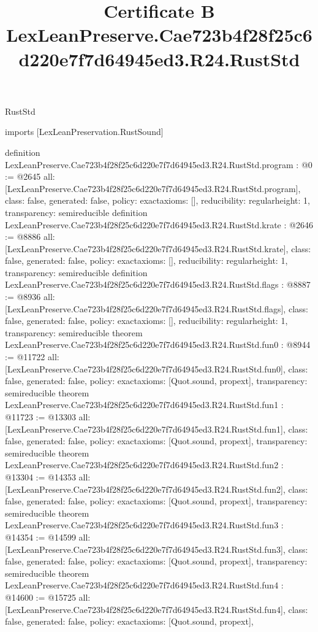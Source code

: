 \begin{lexlean}{RustStd}
\title{Certificate B LexLeanPreserve.Cae723b4f28f25c6d220e7f7d64945ed3.R24.RustStd}
\begin{coremodule}
imports [LexLeanPreservation.RustSound]

definition LexLeanPreserve.Cae723b4f28f25c6d220e7f7d64945ed3.R24.RustStd.program : @0 := @2645 {
  all: [LexLeanPreserve.Cae723b4f28f25c6d220e7f7d64945ed3.R24.RustStd.program],
  class: false,
  generated: false,
  policy: exact{axioms: []},
  reducibility: regular{height: 1},
  transparency: semireducible
}
definition LexLeanPreserve.Cae723b4f28f25c6d220e7f7d64945ed3.R24.RustStd.krate : @2646 := @8886 {
  all: [LexLeanPreserve.Cae723b4f28f25c6d220e7f7d64945ed3.R24.RustStd.krate],
  class: false,
  generated: false,
  policy: exact{axioms: []},
  reducibility: regular{height: 1},
  transparency: semireducible
}
definition LexLeanPreserve.Cae723b4f28f25c6d220e7f7d64945ed3.R24.RustStd.flags : @8887 := @8936 {
  all: [LexLeanPreserve.Cae723b4f28f25c6d220e7f7d64945ed3.R24.RustStd.flags],
  class: false,
  generated: false,
  policy: exact{axioms: []},
  reducibility: regular{height: 1},
  transparency: semireducible
}
theorem LexLeanPreserve.Cae723b4f28f25c6d220e7f7d64945ed3.R24.RustStd.fun0 : @8944 := @11722 {
  all: [LexLeanPreserve.Cae723b4f28f25c6d220e7f7d64945ed3.R24.RustStd.fun0],
  class: false,
  generated: false,
  policy: exact{axioms: [Quot.sound, propext]},
  transparency: semireducible
}
theorem LexLeanPreserve.Cae723b4f28f25c6d220e7f7d64945ed3.R24.RustStd.fun1 : @11723 := @13303 {
  all: [LexLeanPreserve.Cae723b4f28f25c6d220e7f7d64945ed3.R24.RustStd.fun1],
  class: false,
  generated: false,
  policy: exact{axioms: [Quot.sound, propext]},
  transparency: semireducible
}
theorem LexLeanPreserve.Cae723b4f28f25c6d220e7f7d64945ed3.R24.RustStd.fun2 : @13304 := @14353 {
  all: [LexLeanPreserve.Cae723b4f28f25c6d220e7f7d64945ed3.R24.RustStd.fun2],
  class: false,
  generated: false,
  policy: exact{axioms: [Quot.sound, propext]},
  transparency: semireducible
}
theorem LexLeanPreserve.Cae723b4f28f25c6d220e7f7d64945ed3.R24.RustStd.fun3 : @14354 := @14599 {
  all: [LexLeanPreserve.Cae723b4f28f25c6d220e7f7d64945ed3.R24.RustStd.fun3],
  class: false,
  generated: false,
  policy: exact{axioms: [Quot.sound, propext]},
  transparency: semireducible
}
theorem LexLeanPreserve.Cae723b4f28f25c6d220e7f7d64945ed3.R24.RustStd.fun4 : @14600 := @15725 {
  all: [LexLeanPreserve.Cae723b4f28f25c6d220e7f7d64945ed3.R24.RustStd.fun4],
  class: false,
  generated: false,
  policy: exact{axioms: [Quot.sound, propext]},
}
\end{coremodule}
\end{lexlean}
